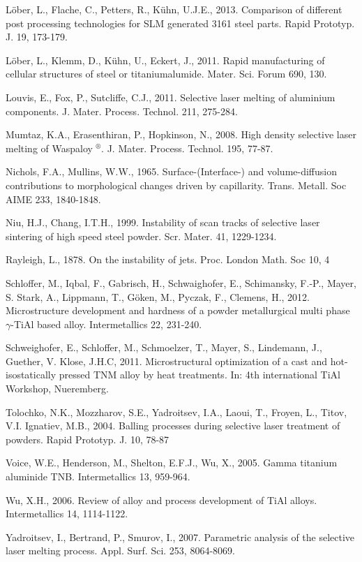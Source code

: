\documentclass[10pt]{article}
\begin{document}
Löber, L., Flache, C., Petters, R., Kühn, U.J.E., 2013. Comparison of different post processing technologies for SLM generated 3161 steel parts. Rapid Prototyp. J. 19, 173-179.

Löber, L., Klemm, D., Kühn, U., Eckert, J., 2011. Rapid manufacturing of cellular structures of steel or titaniumalumide. Mater. Sci. Forum 690, 130.

Louvis, E., Fox, P., Sutcliffe, C.J., 2011. Selective laser melting of aluminium components. J. Mater. Process. Technol. 211, 275-284.

Mumtaz, K.A., Erasenthiran, P., Hopkinson, N., 2008. High density selective laser melting of Waspaloy ${ }^{\circledR}$. J. Mater. Process. Technol. 195, 77-87.

Nichols, F.A., Mullins, W.W., 1965. Surface-(Interface-) and volume-diffusion contributions to morphological changes driven by capillarity. Trans. Metall. Soc AIME 233, 1840-1848.

Niu, H.J., Chang, I.T.H., 1999. Instability of scan tracks of selective laser sintering of high speed steel powder. Scr. Mater. 41, 1229-1234.

Rayleigh, L., 1878. On the instability of jets. Proc. London Math. Soc 10, 4

Schloffer, M., Iqbal, F., Gabrisch, H., Schwaighofer, E., Schimansky, F.-P., Mayer, S. Stark, A., Lippmann, T., Göken, M., Pyczak, F., Clemens, H., 2012. Microstructure development and hardness of a powder metallurgical multi phase $\gamma$-TiAl based alloy. Intermetallics 22, 231-240.

Schweighofer, E., Schloffer, M., Schmoelzer, T., Mayer, S., Lindemann, J., Guether, V. Klose, J.H.C, 2011. Microstructural optimization of a cast and hot-isostatically pressed TNM alloy by heat treatments. In: 4th international TiAl Workshop, Nueremberg.

Tolochko, N.K., Mozzharov, S.E., Yadroitsev, I.A., Laoui, T., Froyen, L., Titov, V.I. Ignatiev, M.B., 2004. Balling processes during selective laser treatment of powders. Rapid Prototyp. J. 10, 78-87

Voice, W.E., Henderson, M., Shelton, E.F.J., Wu, X., 2005. Gamma titanium aluminide TNB. Intermetallics 13, 959-964.

Wu, X.H., 2006. Review of alloy and process development of TiAl alloys. Intermetallics 14, 1114-1122.

Yadroitsev, I., Bertrand, P., Smurov, I., 2007. Parametric analysis of the selective laser melting process. Appl. Surf. Sci. 253, 8064-8069.
\end{document}
